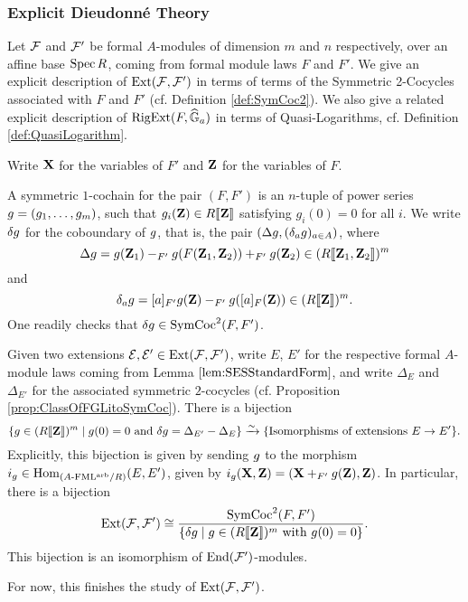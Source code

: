 \documentclass[../main.tex]{subfiles}
\begin{document}
\subsubsection{Explicit Dieudonné Theory} %
\label{ssub:Explicit Dieudonne Theory}
Let $\mathcal{F}$ and $\mathcal{F}'$ be formal $A$-modules of dimension $m$ and $n$ respectively,
over an affine base $\operatorname{Spec} R$, coming from formal module laws $F$ and $F'$. We
give an explicit description of $\operatorname{Ext}(\mathcal{F}, \mathcal{F}')$ in terms of terms of the
Symmetric 2-Cocycles associated with $F$ and $F'$ (cf. Definition
\ref{def:SymCoc2}). 
We also give a related explicit description of $\operatorname {RigExt}(F, \widehat{\mathbb{G}}_a)$ in terms of 
Quasi-Logarithms, cf. Definition \ref{def:QuasiLogarithm}. 

Write $\mathbf{X}$ for the variables of $F'$ and $\mathbf{Z}$ for the variables of $F$.
\begin{defi} \label{def:SymCoc1}
  A symmetric $1$-cochain for the pair $(F,F')$ is an $n$-tuple of power 
  series ${g} = (g_1, \dots, g_m)$, such that $g_i(\mathbf{Z}) \in R\llbracket \mathbf{Z} \rrbracket$
  satisfying $g_i(0) = 0$ for all $i$. We write $\delta {g}$ 
  for the coboundary of ${g}$, that is, the pair $(\Delta {g}, (\delta_a
  {g})_{a \in A})$,
  where
  \begin{equation*}
    \Delta {g} = {g}(\mathbf{Z}_1) -_{F'} {g}(F(\mathbf{Z}_1,\mathbf{Z}_2)) +_{F'} {g}(\mathbf{Z}_2)
    \in (R\llbracket \mathbf{Z}_1, \mathbf{Z}_2 \rrbracket)^m
  \end{equation*}
  and 
  \begin{equation*}
    \delta_a {g} = [a]_{F'} {g}(\mathbf{Z}) -_{F'} {g}([a]_F(\mathbf{Z})) \in (R \llbracket \mathbf{Z}
    \rrbracket)^m.
  \end{equation*}
  One readily checks that $\delta {g} \in \operatorname{SymCoc}^2(F, F')$. 
\end{defi}

\begin{prop}\label{prop:ExtInTermsOfSymCoc}
  Given two extensions $\mathcal{E},\mathcal{E}' \in \operatorname{Ext}(\mathcal{F}, \mathcal{F}')$, write 
  $E$, $E'$ for the respective formal $A$-module laws coming from Lemma
  $\ref{lem:SESStandardForm}$, and write
  $\Delta_E$ and $\Delta_{E'}$ for the associated symmetric $2$-cocycles (cf.
  Proposition \ref{prop:ClassOfFGLitoSymCoc}). There is a bijection
  \begin{equation*}
    \{{g} \in (R\llbracket \mathbf{Z} \rrbracket)^m \mid {g}(0) = 0 \text{ and } \delta {g} = \Delta_{E'} - \Delta_E\}
    \xrightarrow{\sim} \{\text{Isomorphisms of extensions } E \to E' \}.
  \end{equation*}
  Explicitly, this bijection is given by sending ${g}$ to the morphism
  $i_{g} \in \operatorname{Hom}_{{({A}\text-\allowbreak\mathrm{FML^{arb}}/{R})}}(E, E')$, given by 
  $i_{g} (\mathbf{X}, \mathbf{Z}) = (\mathbf{X} +_{F'} {g}(\mathbf{Z}), \mathbf{Z})$. In particular, there is a bijection
  \begin{equation*}
    \operatorname{Ext}(\mathcal{F}, \mathcal{F}') \cong \frac{\operatorname{SymCoc}^2(F, F')}{\{\delta {g} 
    \mid {g} \in (R\llbracket \mathbf{Z} \rrbracket)^m \text{ with } {g}(0) = 0\}}.
  \end{equation*}
  This bijection is an isomorphism of $\operatorname{End}(\mathcal{F}')$-modules.
\end{prop}
For now, this finishes the study of $\operatorname{Ext}(\mathcal{F}, \mathcal{F}')$. 
\end{document}
